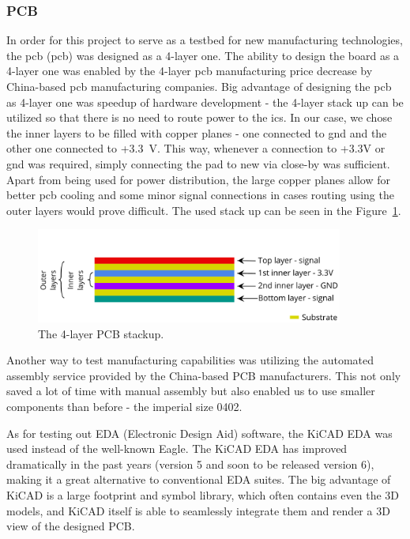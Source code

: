 \newpage
\subsubsection{PCB}
\label{subsubsec:pcb_design}
In order for this project to serve as a testbed for new manufacturing technologies, the \acs{pcb} (\acl{pcb}) was designed as a 4-layer one.
The ability to design the board as a 4-layer one was enabled by the 4-layer \acs{pcb} manufacturing price decrease by China-based \acs{pcb} manufacturing companies.
Big advantage of designing the \acs{pcb} as 4-layer one was speedup of hardware development - the 4-layer stack up can be utilized so that there is no need to route power to the \acs{ic}s.
In our case, we chose the inner layers to be filled with copper planes - one connected to \acs{gnd} and the other one connected to +3.3~V.
This way, whenever a connection to +3.3V or \acs{gnd} was required, simply connecting the pad to new via close-by was sufficient.
Apart from being used for power distribution, the large copper planes allow for better \acs{pcb} cooling and some minor signal connections in cases routing using the outer layers would prove difficult.
The used stack up can be seen in the Figure~\ref{fig:stackup}.

\begin{figure}[H]
    \centering
    \includegraphics[width=0.9\textwidth]{obrazky/stackup}
    \caption{The 4-layer PCB stackup.}
    \label{fig:stackup}
\end{figure}

Another way to test manufacturing capabilities was utilizing the automated assembly service provided by the China-based PCB manufacturers.
This not only saved a lot of time with manual assembly but also enabled us to use smaller components than before - the imperial size 0402.

As for testing out EDA (Electronic Design Aid) software, the KiCAD EDA was used instead of the well-known Eagle.
The KiCAD EDA has improved dramatically in the past years (version 5 and soon to be released version 6), making it a great alternative to conventional EDA suites.
The big advantage of KiCAD is a large footprint and symbol library, which often contains even the 3D models, and KiCAD itself is able to seamlessly integrate them and render a 3D view of the designed PCB.
